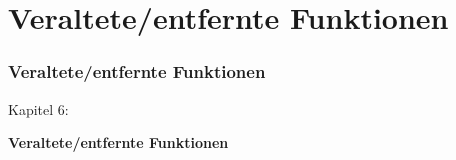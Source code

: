 %

\section{Veraltete/entfernte Funktionen}
\begin{frame}[fragile]
	\frametitle{Veraltete/entfernte Funktionen}

	\begin{center}\huge{Kapitel 6:}\end{center}
	\begin{center}\huge{\color{typo3darkgrey}\textbf{Veraltete/entfernte Funktionen}}\end{center}

\end{frame}

